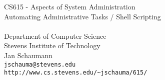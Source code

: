 \documentclass[xga]{xdvislides}
\begin{document}
\setfontphv

\lhead{\slidetitle}                               %
\cfoot{\relax}                               %
\rfoot{\Gray{\today}}

\vspace*{\fill}
\begin{center}
	\Hugesize
		CS615 - Aspects of System Administration\\ [1em]
		Automating Administrative Tasks / Shell Scripting\\ [1em]

	\hspace*{5mm}\blueline\\ [1em]
	\Normalsize
		Department of Computer Science\\
		Stevens Institute of Technology\\
		Jan Schaumann\\
		\verb+jschauma@stevens.edu+\\
		\verb+http://www.cs.stevens.edu/~jschauma/615/+
\end{center}
\vspace*{\fill}
\end{document}
